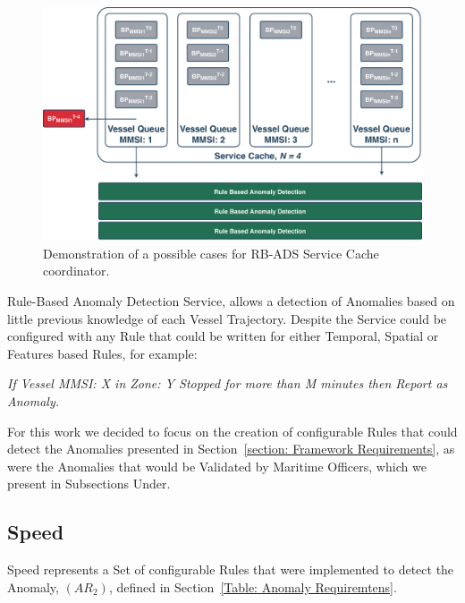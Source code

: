 \begin{figure}[H]
\centering
\includegraphics[scale = .36]{figures/Ch4/RB-ADS.pdf}
\caption{Demonstration of a possible cases for RB-ADS Service Cache coordinator.}
\label{fig: RB-ADS}
\end{figure}

Rule-Based Anomaly Detection Service, allows a detection of Anomalies based on little previous knowledge of each Vessel Trajectory. Despite the Service could be configured with any Rule that could be written for either Temporal, Spatial or Features based Rules, for example:

\textit{If Vessel MMSI: X in Zone: Y Stopped for more than M minutes then Report as Anomaly.}

For this work we decided to focus on the creation of configurable Rules that could detect the Anomalies presented in Section~\ref{section: Framework Requirements}, as were the Anomalies that would be Validated by Maritime Officers,  which we present in Subsections Under.

\subsection{Speed}
\label{subsection: 4 Speed}
Speed represents a Set of configurable Rules that were implemented to detect the Anomaly, $(AR_2)$, defined in Section~\ref{Table: Anomaly Requiremtens}.


